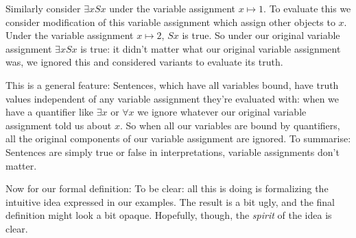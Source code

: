  Similarly consider $\exists x Sx$ under the variable assignment $x\mapsto 1$. To evaluate this we consider modification of this variable assignment which assign other objects to $x$. Under the variable assignment $x\mapsto 2$, $Sx$ is true.  So under our original variable assignment $\exists x Sx$ is true: it didn't matter what our original variable assignment was, we ignored this and considered variants to evaluate its truth.

 This is a general feature: Sentences, which have all variables bound, have truth values independent of any variable assignment they're evaluated with: when we have a quantifier like $\exists x$ or $\forall x$ we ignore whatever our original variable assignment told us about $x$. So when all our variables are bound by quantifiers, all the original components of our variable assignment are ignored. To summarise: Sentences are simply true or false in interpretations, variable assignments don't matter.

 Now for our formal definition:
To be clear: all this is doing is formalizing the intuitive idea expressed in our examples. The result is a bit ugly, and the final definition might look a bit opaque. Hopefully, though, the \emph{spirit} of the idea is clear.


